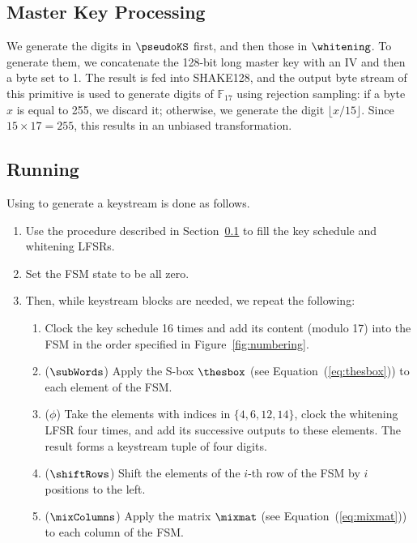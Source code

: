 \subsection{Master Key Processing}
\label{app:spec-masterkey}

We generate the digits in $\pseudoKS$ first, and then those in $\whitening$. To generate them, we concatenate the 128-bit long master key with an IV and then a byte set to 1. The result is fed into \textsf{SHAKE128}, and the output byte stream of this primitive is used to generate digits of $\mathbb{F}_{17}$ using rejection sampling: if a byte $x$ is equal to 255, we discard it; otherwise, we generate the digit $\lfloor x / 15 \rfloor$. Since $15 \times 17 = 255$, this results in an unbiased transformation.


\subsection{Running \coolName{}}
\label{app:spec-transistor}

Using \coolName{} to generate a keystream is done as follows.
\begin{enumerate}
\item Use the procedure described in Section~\ref{app:spec-masterkey} to fill the key schedule and whitening LFSRs.
\item Set the FSM state to be all zero.
\item Then, while keystream blocks are needed, we repeat the following:
  \begin{enumerate}
  \item Clock the key schedule 16 times and add its content (modulo 17) into the FSM in the order specified in Figure~\ref{fig:numbering}.
  \item ($\subWords$) Apply the S-box $\thesbox$ (see Equation~(\ref{eq:thesbox})) to each element of the FSM.
  \item ($\phi$) Take the elements with indices in $\{ 4, 6, 12, 14\}$, clock the whitening LFSR four times, and add its successive outputs to these elements. The result forms a keystream tuple of four digits.
  \item ($\shiftRows$) Shift the elements of the $i$-th row of the FSM by $i$ positions to the left.
  \item ($\mixColumns$) Apply the matrix $\mixmat$ (see Equation~(\ref{eq:mixmat})) to each column of the FSM.
  \end{enumerate}
\end{enumerate}


